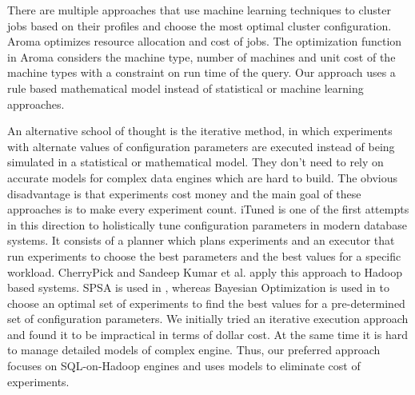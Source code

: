There are multiple approaches \cite{wu2013self} \cite{lama2012aroma} that use machine learning techniques
to cluster jobs based on their profiles and choose the most optimal cluster configuration. Aroma \cite{lama2012aroma} optimizes resource allocation and cost of jobs.  The optimization function in Aroma considers
the machine type, number of machines and unit cost of the machine types with a constraint on
run time of the query. Our approach uses a rule based mathematical model instead of statistical or machine learning approaches. 

An alternative school of thought is the iterative method, in which experiments
with alternate values of configuration parameters are executed instead of being simulated in a statistical or mathematical model. They don't need to rely on accurate models for complex data engines which are hard to build. The obvious disadvantage is that experiments cost money and the main 
goal of these approaches is to make every experiment count.
iTuned\cite{Duan} is one of the first attempts in this direction to holistically 
tune configuration parameters in modern database systems. It consists of a planner
which plans experiments and an executor that run experiments to choose the best parameters
and the best values for a specific workload. 
CherryPick\cite{LiMinZeng} and Sandeep Kumar et al.\cite{KumarPLPGB16} apply this approach to Hadoop based systems.  SPSA is used in \cite{KumarPLPGB16}, whereas Bayesian Optimization is used in \cite{LiMinZeng} 
to choose an optimal set of experiments to find the best values for a pre-determined set of configuration parameters.
We initially tried an iterative execution approach and found it to be impractical in terms of dollar cost\cite{fullpaper}. At the same time it is hard to manage detailed models of complex engine. Thus, 
our preferred approach focuses on SQL-on-Hadoop engines and uses models to eliminate cost of experiments.


